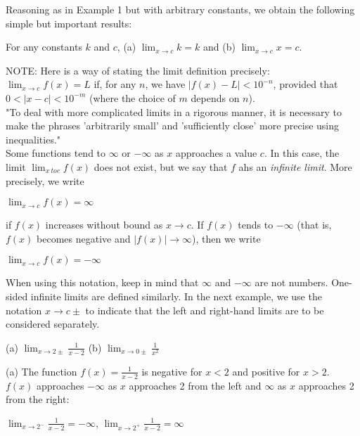 \documentclass{article}
\begin{document}
Reasoning as in Example 1 but with arbitrary constants, we obtain the following simple but important results:
\begin{center}For any constants $k$ and $c$, (a) $\lim_{x \to c}k = k$ and (b) $\lim_{x \to c}x = c$.\end{center}

NOTE: Here is a way of stating the limit definition precisely:\\
$\lim_{x \to c}f(x) = L$ if, for any $n$, we have $\left|f(x) -  L\right| < 10^{-n}$, provided that $0 < \left|x - c\right| < 10^{-m}$ (where the choice of $m$ depends on $n$).\\

"To deal with more complicated limits in a rigorous manner, it is necessary to make the phrases 'arbitrarily small' and 'sufficiently close' more precise using inequalities."\\

Some functions tend to $\infty$ or $-\infty$ as $x$ approaches a value $c$. In this case, the limit $\lim_{x \ to c}f(x)$ does not exist, but we say that $f$ ahs an \textit{infinite limit}. More precisely, we write
\begin{center}$\lim_{x \to c}f(x)=\infty$\end{center}
if $f(x)$ increases without bound as $x \to c$. If $f(x)$ tends to $-\infty$ (that is, $f(x)$ becomes negative and $\left|f(x)\right| \to \infty$), then we write
\begin{center}$\lim_{x \to c}f(x)=-\infty$\end{center}

When using this notation, keep in mind that $\infty$ and $-\infty$ are not numbers. One-sided infinite limits are defined similarly. In the next example, we use the notation $x \to c\pm$ to indicate that the left and right-hand limits are to be considered separately.

\begin{center}(a) $\lim_{x \to 2\pm}\frac{1}{x - 2}$ (b) $\lim_{x \to 0\pm}\frac{1}{x^2}$\end{center}

(a) The function $f(x) = \frac{1}{x - 2}$ is negative for $x < 2$ and positive for $x > 2$. $f(x)$ approaches $-\infty$ as $x$ approaches 2 from the left and $\infty$ as $x$ approaches 2 from the right:
\begin{center}$\lim_{x \to 2^-}\frac{1}{x - 2} = -\infty$, $\lim_{x \to 2^+}\frac{1}{x - 2} = \infty$\end{center}
\end{document}
